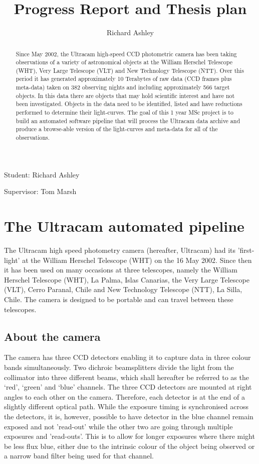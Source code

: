 \documentclass[a4paper,10pt]{article}
\begin{document}
\title{Progress Report and Thesis plan}
\author{Richard Ashley}
\maketitle
\begin{flushright}
Student: Richard Ashley

Supervisor: Tom Marsh
\end{flushright}

\begin{abstract} 
Since May 2002, the  Ultracam high-speed CCD photometric camera has been taking observations of a variety of astronomical objects at the William Herschel Telescope (WHT), Very Large Telescope (VLT) and New Technology Telescope (NTT). Over this period it has generated approximately 10 Terabytes of raw data (CCD frames plus meta-data) taken on 382 observing nights and including 
approximately 566 target objects. In this data there are objects that may hold scientific interest and have not been investigated. 
Objects in the data need to be identified, listed and have reductions performed to determine their light-curves. The goal of 
this 1 year MSc project is to build an automated software pipeline that will process the Ultracam data archive and produce a browse-able 
version of the light-curves and meta-data for all of the observations. 
\end{abstract}

\section{The Ultracam automated pipeline} 

The Ultracam high speed photometry camera (hereafter, Ultracam) had its 'first-light' at the William Herschel Telescope (WHT) on the 16 May 2002. Since then it has been used on many occasions at three telescopes, namely the William Herschel Telescope (WHT), La Palma, Islas Canarias, the Very Large Telescope (VLT), Cerro Paranal, Chile and New Technology Telescope (NTT), La Silla, Chile. The camera is designed to be portable and can travel between these telescopes. 

\subsection{About the camera}
The camera has three CCD detectors enabling it to capture data in three colour bands simultaneously. Two dichroic beamsplitters divide the light from the collimator into three different beams, which shall hereafter be referred to as the ‘red’, ‘green’ and ‘blue’ channels. The three CCD detectors are mounted at right angles to each other on the camera. Therefore, each detector is at the end of a slightly different optical path. While the exposure timing is synchronised across the detectors, it is, however, possible to have detector in the blue channel remain exposed and not 'read-out' while the other two are going through multiple exposures and 'read-outs'. This is to allow for longer exposures where there might be less flux blue, either due to the intrinsic colour of the object being observed or a narrow band filter being used for that channel. 
\end{document}
